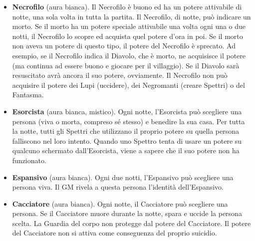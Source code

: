 \documentclass[a4paper,10pt]{article}
\begin{document}
\begin{itemize}

 \item {\bf Necrofilo} (aura bianca). Il Necrofilo è buono ed ha un potere attivabile di notte, una sola volta in tutta la partita.
 Il Necrofilo, di notte, può indicare un morto. Se il morto ha un potere speciale attivabile una volta ogni una o due notti, il Necrofilo lo scopre ed acquista quel potere d'ora in poi. Se il morto non aveva un potere di questo tipo, il potere del Necrofilo è sprecato. Ad esempio, se il Necrofilo indica il Diavolo, che è morto, ne acquisisce il potere (ma continua ad essere buono e giocare per il villaggio). Se il Diavolo sarà resuscitato avrà ancora il suo potere, ovviamente.
 Il Necrofilo non può acquisire il potere dei Lupi (uccidere), dei Negromanti (creare Spettri) o del Fantasma.

 \item {\bf Esorcista} (aura bianca, mistico). Ogni notte, l'Esorcista può scegliere una persona (viva o morta, compreso sé stesso) e benedire la sua casa.
 Per tutta la notte, tutti gli Spettri che utilizzano il proprio potere su quella persona falliscono nel loro intento.
 Quando uno Spettro tenta di usare un potere su qualcuno schermato dall'Esorcista, viene a sapere che il suo potere non ha funzionato.
 


 \item {\bf Espansivo} (aura bianca). Ogni due notti, l'Espansivo può scegliere una persona viva. Il GM rivela a questa persona l'identità dell'Espansivo.

 \item {\bf Cacciatore} (aura bianca). Ogni notte, il Cacciatore può scegliere una persona. Se il Cacciatore muore durante la notte, spara e uccide la persona scelta.
 La Guardia del corpo non protegge dal potere del Cacciatore.
 Il potere del Cacciatore non si attiva come conseguenza del proprio suicidio.


\end{itemize}
\end{document}
